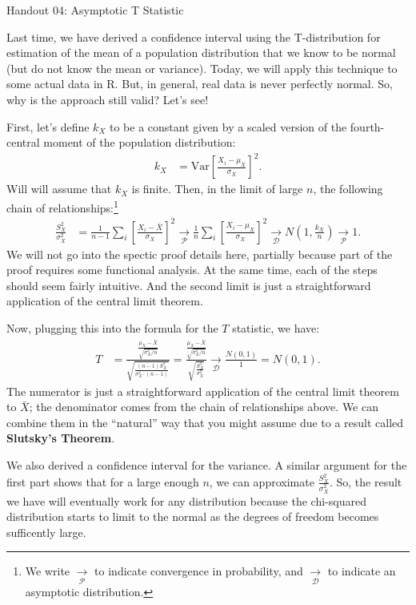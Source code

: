 \documentclass{tufte-handout}
\newcommand{\V}{\text{Var}}
\begin{document}
\justify

{\LARGE Handout 04: Asymptotic T Statistic}

\vspace*{18pt}

\noindent
Last time, we have derived a confidence interval using the
T-distribution for estimation of the mean of a population
distribution that we know to be normal (but do not know the
mean or variance). Today, we will apply this technique to
some actual data in R. But, in general, real data is never
perfectly normal. So, why is the approach still valid? Let's
see!

\vspace*{24pt}

\noindent
First, let's define $k_X$ to be a constant given by a scaled
version of the fourth-central moment of the population distribution:
\begin{align*}
k_X &= \V \left[ \frac{X_i - \mu_X}{\sigma_X} \right]^2.
\end{align*}
Will will assume that $k_X$ is finite. Then, in the limit of large
$n$, the following chain of relationships:\footnote{
  We write $\xrightarrow[\mathcal{P}]{}$ to indicate convergence
  in probability, and $\xrightarrow[\mathcal{D}]{}$ to indicate
  an asymptotic distribution.
}
\begin{align*}
\frac{S_X^2}{\sigma_X^2} &= \frac{1}{n-1} \sum_i \left[ \frac{X_i - \bar{X}}{\sigma_X} \right]^2
\xrightarrow[\mathcal{P}]{}  \frac{1}{n} \sum_i \left[ \frac{X_i - \mu_X}{\sigma_X} \right]^2
\xrightarrow[\mathcal{D}]{} N(1, \frac{k_X}{n}) \xrightarrow[\mathcal{P}]{} 1.
\end{align*}
We will not go into the spectic proof details here, partially
because part of the proof requires some functional analysis. At
the same time, each of the steps should seem fairly intuitive.
And the second limit is just a straightforward application of
the central limit theorem.

Now, plugging this into the formula for the $T$ statistic, we have:
\begin{align*}
T &= \frac{\frac{\mu_X - \bar{X}}{\sqrt{\sigma_X^2 / n}}}{\sqrt{\frac{(n-1)S^2_X}{\sigma_X^2 \cdot (n-1)}}}
= \frac{\frac{\mu_X - \bar{X}}{\sqrt{\sigma_X^2 / n}}}{\sqrt{\frac{S^2_X}{\sigma_X^2}}}
\xrightarrow[\mathcal{D}]{} \frac{N(0, 1)}{1} = N(0, 1).
\end{align*}
The numerator is just a straightforward application of the central
limit theorem to $\bar{X}$; the denominator comes from the chain of
relationships above. We can combine them in the ``natural'' way that
you might assume due to a result called \textbf{Slutsky's Theorem}. 

\vspace*{24pt}

\noindent
We also derived a confidence interval for the variance. A similar 
argument for the first part shows that for a large enough $n$, we
can approximate $\frac{S_X^2}{\sigma_X^2}$. So, the result we have
will eventually work for any distribution because the chi-squared
distribution starts to limit to the normal as the degrees of freedom
becomes sufficently large.
\end{document}
